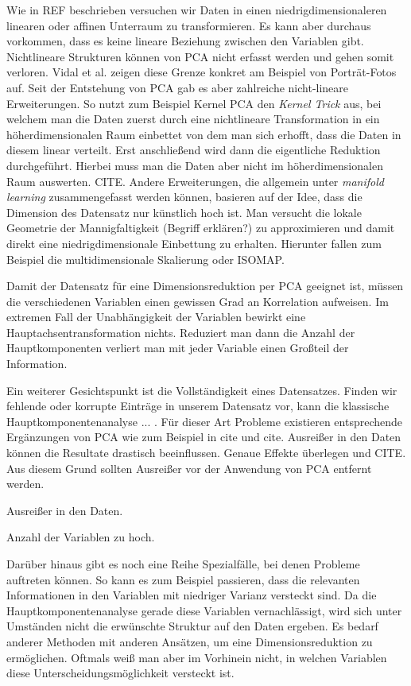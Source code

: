 Wie in REF beschrieben versuchen wir Daten in einen niedrigdimensionaleren linearen oder affinen Unterraum zu transformieren. Es kann aber durchaus vorkommen, dass es keine lineare Beziehung zwischen den Variablen gibt. Nichtlineare Strukturen können von PCA nicht erfasst werden und gehen somit verloren. \cite{vidal} Vidal et al. zeigen diese Grenze konkret am Beispiel von Porträt-Fotos auf. Seit der Entstehung von PCA gab es aber zahlreiche nicht-lineare Erweiterungen. So nutzt zum Beispiel Kernel PCA den \textit{Kernel Trick} aus, bei welchem man die Daten zuerst durch eine nichtlineare Transformation in ein höherdimensionalen Raum einbettet von dem man sich erhofft, dass die Daten in diesem linear verteilt. Erst anschließend wird dann die eigentliche Reduktion durchgeführt. Hierbei muss man die Daten aber nicht im höherdimensionalen Raum auswerten. CITE. Andere Erweiterungen, die allgemein unter \textit{manifold learning} zusammengefasst werden können, basieren auf der Idee, dass die Dimension des Datensatz nur künstlich hoch ist. Man versucht die lokale Geometrie der Mannigfaltigkeit (Begriff erklären?) zu approximieren und damit direkt eine niedrigdimensionale Einbettung zu erhalten. Hierunter fallen zum Beispiel die multidimensionale Skalierung oder ISOMAP.

Damit der Datensatz für eine Dimensionsreduktion per PCA geeignet ist, müssen die verschiedenen Variablen einen gewissen Grad an Korrelation aufweisen. Im extremen Fall der Unabhängigkeit der Variablen bewirkt eine Hauptachsentransformation nichts. Reduziert man dann die Anzahl der Hauptkomponenten verliert man mit jeder Variable einen Großteil der Information.

Ein weiterer Gesichtspunkt ist die Vollständigkeit eines Datensatzes. Finden wir fehlende oder korrupte Einträge in unserem Datensatz vor, kann die klassische Hauptkomponentenanalyse ... . Für dieser Art Probleme existieren entsprechende Ergänzungen von PCA wie zum Beispiel in cite und cite. Ausreißer in den Daten können die Resultate drastisch beeinflussen. Genaue Effekte überlegen und CITE. Aus diesem Grund sollten Ausreißer vor der Anwendung von PCA entfernt werden.

Ausreißer in den Daten.

Anzahl der Variablen zu hoch.

Darüber hinaus gibt es noch eine Reihe Spezialfälle, bei denen Probleme auftreten können. So kann es zum Beispiel passieren, dass die relevanten Informationen in den Variablen mit niedriger Varianz versteckt sind. Da die Hauptkomponentenanalyse gerade diese Variablen vernachlässigt, wird sich unter Umständen nicht die erwünschte Struktur auf den Daten ergeben. Es bedarf anderer Methoden mit anderen Ansätzen, um eine Dimensionsreduktion zu ermöglichen. Oftmals weiß man aber im Vorhinein nicht, in welchen Variablen diese Unterscheidungsmöglichkeit versteckt ist.

